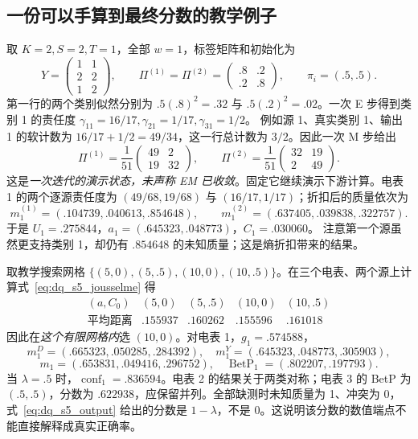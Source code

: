 \subsection{一份可以手算到最终分数的教学例子}

\begin{example}[两源、三电表、一次 EM 更新]
取 $K=2,S=2,T=1$，全部 $w=1$，标签矩阵和初始化为
\[
 Y=\begin{pmatrix}1&1\\2&2\\1&2\end{pmatrix},\qquad
 \Pi^{(1)}=\Pi^{(2)}=\begin{pmatrix}.8&.2\\.2&.8\end{pmatrix},\qquad
 \pi_i=(.5,.5).
\]
第一行的两个类别似然分别为 $.5(.8)^2=.32$ 与 $.5(.2)^2=.02$。一次 E 步得到类别 1 的责任度
$\gamma_{11}=16/17,\gamma_{21}=1/17,\gamma_{31}=1/2$。
例如源 1、真实类别 1、输出 1 的软计数为 $16/17+1/2=49/34$，这一行总计数为 $3/2$。因此一次 M 步给出
\[
 \Pi^{(1)}=\frac1{51}\begin{pmatrix}49&2\\19&32\end{pmatrix},\qquad
 \Pi^{(2)}=\frac1{51}\begin{pmatrix}32&19\\2&49\end{pmatrix}.
\]
这是\emph{一次迭代的演示状态，未声称 EM 已收敛}。固定它继续演示下游计算。电表 1 的两个逐源责任度为
$(49/68,19/68)$ 与 $(16/17,1/17)$；折扣后的质量依次为
\[
 m_1^{(1)}=(.104739,.040613,.854648),\qquad
 m_1^{(2)}=(.637405,.039838,.322757).
\]
于是 $U_1=.275844$，$a_1=(.645323,.048773)$，$C_1=.030060$。
注意第一个源虽然更支持类别 1，却仍有 $.854648$ 的未知质量；这是熵折扣带来的结果。

取教学搜索网格 $\{(5,0),(5,.5),(10,0),(10,.5)\}$。在三个电表、两个源上计算式~\eqref{eq:dq_s5_jousselme} 得
\[
 \begin{array}{c|rrrr}
 (a,C_0)&(5,0)&(5,.5)&(10,0)&(10,.5)\\\hline
 \text{平均距离}&.155937&.160262&.155596&.161018
 \end{array}
\]
因此在\emph{这个有限网格内}选 $(10,0)$。对电表 1，$g_1=.574588$，
\[
 m_1^D=(.665323,.050285,.284392),\quad
 m_1^Y=(.645323,.048773,.305903),
\]
\[
 m_1=(.653831,.049416,.296752),\quad
 \operatorname{BetP}_1=(.802207,.197793).
\]
当 $\lambda=.5$ 时，$\operatorname{conf}_1=.836594$。电表 2 的结果关于两类对称；电表 3 的 BetP 为 $(.5,.5)$，分数为 $.622938$，应保留并列。全部缺测时未知质量为 1、冲突为 0，式~\eqref{eq:dq_s5_output} 给出的分数是 $1-\lambda$，不是 0。这说明该分数的数值端点不能直接解释成真实正确率。
\end{example}

